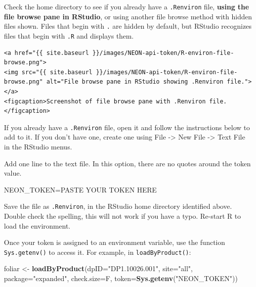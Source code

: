 \documentclass[]{book}
\newenvironment{Shaded}{\begin{snugshade}}{\end{snugshade}}
\newcommand{\DataTypeTok}[1]{\textcolor[rgb]{0.13,0.29,0.53}{#1}}
\newcommand{\KeywordTok}[1]{\textcolor[rgb]{0.13,0.29,0.53}{\textbf{#1}}}
\newcommand{\NormalTok}[1]{#1}
\newcommand{\StringTok}[1]{\textcolor[rgb]{0.31,0.60,0.02}{#1}}
\begin{document}
Check the home directory to see if you already have a \texttt{.Renviron} file, \textbf{using
the file browse pane in RStudio}, or using another file browse method with
hidden files shown. Files that begin with \texttt{.} are hidden by default, but
RStudio recognizes files that begin with \texttt{.R} and displays them.

\begin{verbatim}
<a href="{{ site.baseurl }}/images/NEON-api-token/R-environ-file-browse.png">
<img src="{{ site.baseurl }}/images/NEON-api-token/R-environ-file-browse.png" alt="File browse pane in RStudio showing .Renviron file."></a>
<figcaption>Screenshot of file browse pane with .Renviron file. 
</figcaption>
\end{verbatim}

If you already have a \texttt{.Renviron} file, open it and follow the instructions
below to add to it. If you don't have one, create one using File -\textgreater{} New File
-\textgreater{} Text File in the RStudio menus.

Add one line to the text file. In this option, there are no quotes around the
token value.

\begin{Shaded}
\begin{Highlighting}[]
\NormalTok{NEON_TOKEN=PASTE YOUR TOKEN HERE}
\end{Highlighting}
\end{Shaded}

Save the file as \texttt{.Renviron}, in the RStudio home directory identified above.
Double check the spelling, this will not work if you have a typo. Re-start
R to load the environment.

Once your token is assigned to an environment variable, use the function
\texttt{Sys.getenv()} to access it. For example, in \texttt{loadByProduct()}:

\begin{Shaded}
\begin{Highlighting}[]
\NormalTok{foliar <-}\StringTok{ }\KeywordTok{loadByProduct}\NormalTok{(}\DataTypeTok{dpID=}\StringTok{"DP1.10026.001"}\NormalTok{, }\DataTypeTok{site=}\StringTok{"all"}\NormalTok{, }
                        \DataTypeTok{package=}\StringTok{"expanded"}\NormalTok{, }\DataTypeTok{check.size=}\NormalTok{F,}
                        \DataTypeTok{token=}\KeywordTok{Sys.getenv}\NormalTok{(}\StringTok{"NEON_TOKEN"}\NormalTok{))}
\end{Highlighting}
\end{Shaded}
\end{document}
